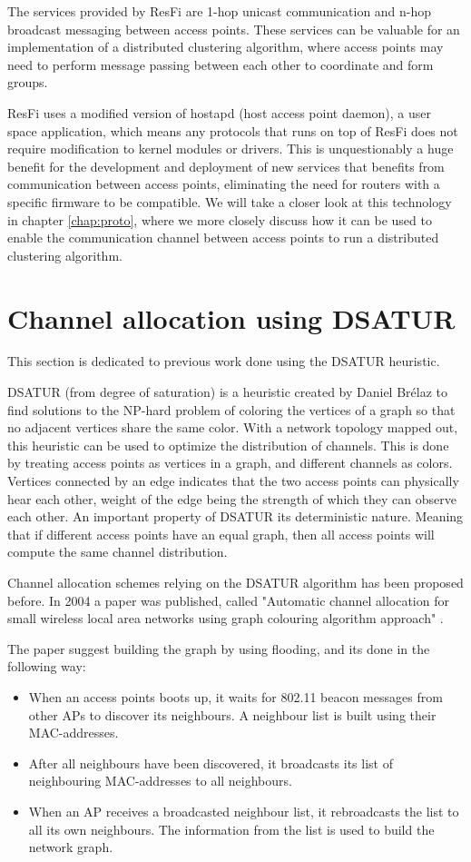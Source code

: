 The services provided by ResFi are 1-hop unicast communication and n-hop broadcast messaging between access points. These services can be valuable for an
implementation of a distributed clustering algorithm, where access points
may need to perform message passing between each other to coordinate and form groups. 

ResFi uses a modified version of hostapd (host access point daemon), a user space application, which means any
protocols that runs on top of ResFi does not require modification to kernel modules or drivers. This is unquestionably a huge benefit for the development and deployment of
new services that benefits from communication between access points, eliminating the need for routers with a specific firmware to be compatible. 
We will take a closer look at this technology in chapter \ref{chap:proto}, where we more closely discuss how it can be used to enable the
communication channel between access points to run a distributed clustering algorithm. 


\section{Channel allocation using DSATUR} 
This section is dedicated to previous work done using the DSATUR heuristic.

DSATUR (from degree of saturation) is a heuristic created by Daniel Brélaz \cite{Brelaz} to find solutions to the NP-hard problem of coloring the vertices of a graph so that no adjacent vertices share the same color.  With a network topology mapped out, this heuristic can be used to optimize the distribution of channels. This is done by treating access points as vertices in a graph, and different channels as colors. Vertices connected by an edge indicates that the two access points can physically hear each other, weight of the edge being the strength of which they can observe each other.  An
important property of DSATUR its deterministic nature. Meaning that if different access points have an equal graph, then all access points will compute the same channel distribution.

Channel allocation schemes relying on the DSATUR algorithm has been proposed before. In 2004 a paper was published, called
"Automatic channel allocation for small wireless local area networks using graph colouring algorithm approach" \cite{mahonen}.

The paper suggest building the graph by using flooding, and its done in the following way:
\begin{itemize}
	\item When an access points boots up, it waits for 802.11 beacon messages from other APs to discover its neighbours. A neighbour list is built using their MAC-addresses. 
	\item After all neighbours have been discovered, it broadcasts its list of neighbouring MAC-addresses to all neighbours.  
	\item When an AP receives a broadcasted neighbour list, it rebroadcasts the list to all its own neighbours. The information from the list is used to build the network graph. 
\end{itemize}

